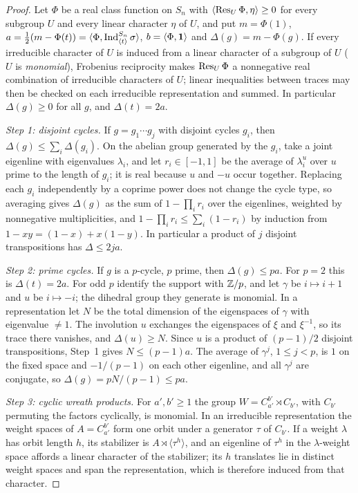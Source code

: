 \begin{proof}
Let $\Phi$ be a real class function on $S_n$ with $\langle\operatorname{Res}_U\Phi,\eta\rangle\ge0$ for every
subgroup $U$ and every linear character $\eta$ of $U$, and put $m=\Phi(1)$,
$a=\tfrac12(m-\Phi(t))=\langle\Phi,\operatorname{Ind}_{\langle t\rangle}^{S_n}\sigma\rangle$,
$b=\langle\Phi,\mathbf{1}\rangle$ and $\Delta(g)=m-\Phi(g)$. If every irreducible character of
$U$ is induced from a linear character of a subgroup of $U$ ($U$ is \emph{monomial}),
Frobenius reciprocity makes $\operatorname{Res}_U\Phi$ a nonnegative real combination of irreducible
characters of $U$; linear inequalities between traces may then be checked on each
irreducible representation and summed. In particular $\Delta(g)\ge0$ for all $g$, and
$\Delta(t)=2a$.

\emph{Step 1: disjoint cycles.} If $g=g_1\cdots g_j$ with disjoint cycles $g_i$, then
$\Delta(g)\le\sum_i\Delta(g_i)$. On the abelian group generated by the $g_i$, take a joint
eigenline with eigenvalues $\lambda_i$, and let $r_i\in[-1,1]$ be the average of
$\lambda_i^u$ over $u$ prime to the length of $g_i$; it is real because $u$ and $-u$
occur together. Replacing each $g_i$ independently by a coprime power does not change the
cycle type, so averaging gives $\Delta(g)$ as the sum of $1-\prod_ir_i$ over the eigenlines,
weighted by nonnegative multiplicities, and $1-\prod_ir_i\le\sum_i(1-r_i)$ by induction from
$1-xy=(1-x)+x(1-y)$. In particular a product of $j$ disjoint transpositions has
$\Delta\le2ja$.

\emph{Step 2: prime cycles.} If $g$ is a $p$-cycle, $p$ prime, then $\Delta(g)\le pa$. For
$p=2$ this is $\Delta(t)=2a$. For odd $p$ identify the support with $\mathbb{Z}/p$, and let $\gamma$
be $i\mapsto i+1$ and $u$ be $i\mapsto-i$; the dihedral group they generate is monomial. In a
representation let $N$ be the total dimension of the eigenspaces of $\gamma$ with eigenvalue
$\ne1$. The involution $u$ exchanges the eigenspaces of $\xi$ and $\xi^{-1}$, so its trace
there vanishes, and $\Delta(u)\ge N$. Since $u$ is a product of $(p-1)/2$ disjoint
transpositions, Step~1 gives $N\le(p-1)a$. The average of $\gamma^j$, $1\le j<p$, is $1$ on
the fixed space and $-1/(p-1)$ on each other eigenline, and all $\gamma^j$ are conjugate,
so $\Delta(g)=pN/(p-1)\le pa$.

\emph{Step 3: cyclic wreath products.} For $a',b'\ge1$ the group
$W=C_{a'}^{b'}\rtimes C_{b'}$, with $C_{b'}$ permuting the factors cyclically, is monomial.
In an irreducible representation the weight spaces of $A=C_{a'}^{b'}$ form one orbit under
a generator $\tau$ of $C_{b'}$. If a weight $\lambda$ has orbit length $h$, its stabilizer is
$A\rtimes\langle\tau^h\rangle$, and an eigenline of $\tau^h$ in the $\lambda$-weight space
affords a linear character of the stabilizer; its $h$ translates lie in distinct weight
spaces and span the representation, which is therefore induced from that character.


\end{proof}

